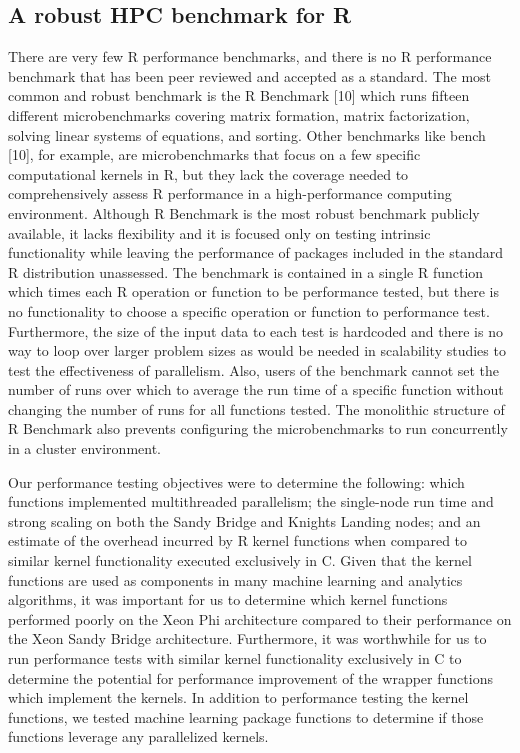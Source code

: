 \subsection{A robust HPC benchmark for R}
There are very few R performance benchmarks,
and there is no R performance benchmark that has been peer reviewed and accepted as a
standard.  The most common and robust benchmark is the R Benchmark [10] which runs fifteen
different microbenchmarks covering matrix formation, matrix factorization, solving linear
systems of equations, and sorting.  Other benchmarks like bench [10], for example, are
microbenchmarks that focus on a few specific computational kernels in R, but they lack the
coverage needed to comprehensively assess R performance in a high-performance computing
environment. Although R Benchmark is the most robust benchmark publicly available, it
lacks flexibility and it is focused only on testing intrinsic functionality while leaving
the performance of packages included in the standard R distribution unassessed.  The
benchmark is contained in a single R function which times each R operation or function to
be performance tested, but there is no functionality to choose a specific operation or
function to performance test. Furthermore, the size of the input data to each test is
hardcoded and there is no way to loop over larger problem sizes as would be needed in
scalability studies to test the effectiveness of parallelism.  Also, users of the
benchmark cannot set the number of runs over which to average the run time of a specific
function without changing the number of runs for all functions tested.  The monolithic
structure of R Benchmark also prevents configuring the microbenchmarks to run concurrently
in a cluster environment.

Our performance testing objectives were to determine the following: which
  functions implemented multithreaded parallelism; the single-node
  run time and strong scaling on both the Sandy Bridge and Knights
  Landing nodes; and an estimate of the overhead incurred by R kernel functions
  when compared to similar kernel functionality executed exclusively in C.
Given that the kernel functions are used as components in many machine learning
  and analytics algorithms, it was important for us to determine which kernel
  functions performed poorly on the Xeon Phi architecture compared to their
  performance on the Xeon Sandy Bridge architecture.
Furthermore, it was worthwhile for us to run performance tests with
  similar kernel functionality exclusively in C to determine the potential
  for performance improvement of the wrapper functions which implement the
  kernels.
In addition to performance testing the kernel functions, we tested machine
  learning package functions to determine if those functions leverage any
  parallelized kernels.

